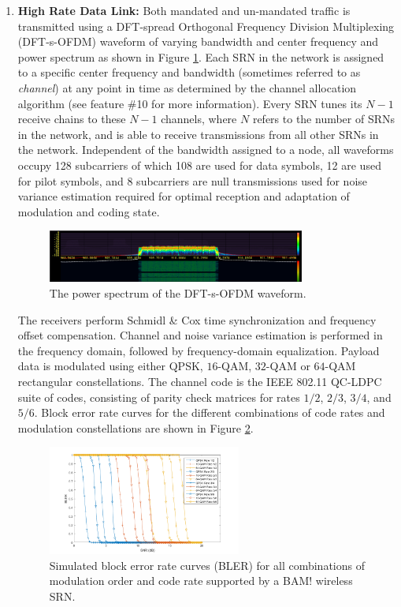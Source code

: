 \documentclass[11pt]{article}
\begin{document}
\begin{enumerate}
     \item \textbf{High Rate Data Link:}
     Both mandated and un-mandated traffic is transmitted using a DFT-spread Orthogonal Frequency Division Multiplexing (DFT-s-OFDM) waveform of varying bandwidth and center frequency and power spectrum as shown in Figure \ref{fg:PowSpec}. Each SRN in the network is assigned to a specific center frequency and bandwidth (sometimes referred to as \emph{channel}) at any point in time as determined by the channel allocation algorithm (see feature $\#$10 for more information). Every SRN tunes its $N-1$ receive chains to these $N-1$ channels, where $N$ refers to the number of SRNs in the network, and is able to receive transmissions from all other SRNs in the network. Independent of the bandwidth assigned to a node, all waveforms occupy 128 subcarriers of which 108 are used for data symbols, 12 are used for pilot symbols, and 8 subcarriers are null transmissions used for noise variance estimation required for optimal reception and adaptation of modulation and coding state.  
     \begin{figure} [htb]
     \centerline{
     \includegraphics[width = 0.8\textwidth]{Figures/PowSpec.png}}
     \caption{The power spectrum of the DFT-s-OFDM waveform.}
     \label{fg:PowSpec}
     \end{figure}
     The receivers perform Schmidl \& Cox time synchronization and frequency offset compensation. Channel and noise variance estimation is performed in the frequency domain, followed by frequency-domain equalization. Payload data is modulated using either QPSK, $16$-QAM, $32$-QAM or $64$-QAM rectangular constellations. The channel code is the IEEE 802.11 QC-LDPC suite of codes, consisting of parity check matrices for rates $1/2$, $2/3$, $3/4$, and $5/6$.  Block error rate curves for the different combinations of code rates and modulation constellations are shown in Figure \ref{fg:BLER}.
     \begin{figure} [htb]
     \centerline{
     \includegraphics[width = 0.6\textwidth]{Figures/BLER.png}}
     \caption{Simulated block error rate curves (BLER) for all combinations of modulation order
     and code rate supported by a BAM! wireless SRN.}
     \label{fg:BLER}
     \end{figure}


\end{enumerate}
\end{document}
